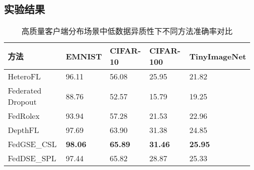 \subsection{实验结果}

\begin{table}[thbp]
    \caption{\label{tab:feddse_total_high_res}高质量客户端分布场景中低数据异质性下不同方法准确率对比}
    \begin{tabularx}{\linewidth}{l X<{\centering} X<{\centering} X<{\centering} X<{\centering}}
        \toprule
        方法 & EMNIST & CIFAR-10 & CIFAR-100 & TinyImageNet \\ \hline
        HeteroFL & 96.11 & 56.08 & 25.95 & 21.82 \\ 
        Federated Dropout & 88.76 & 52.57 & 15.79 & 19.25 \\ 
        FedRolex & 93.94 & 57.28 & 21.53 & 22.96 \\ 
        DepthFL & 97.69 & 63.90 & 31.38 & 24.85 \\ 
        FedGSE\_CSL & \textbf{98.06}  & \textbf{65.89} & \textbf{31.46} & \textbf{25.95}  \\ 
        FedDSE\_SPL & 97.44  & 65.82 & 28.87 &  25.33 \\ 
        \bottomrule
    \end{tabularx}
\end{table}


